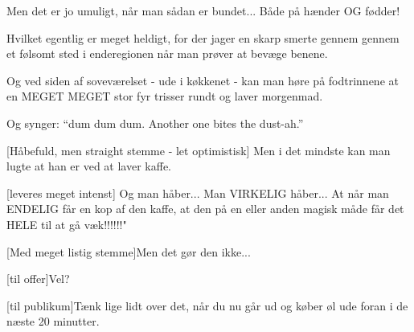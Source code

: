 \documentclass[a4paper,11pt]{article}
\begin{document}
\begin{sketch}

Men det er jo umuligt, når man sådan er bundet... Både på hænder OG
fødder!


Hvilket egentlig er meget heldigt, for der jager en skarp smerte
gennem gennem et følsomt sted i enderegionen når man prøver at bevæge
benene.


Og ved siden af soveværelset - ude i køkkenet - kan man høre på
fodtrinnene at en MEGET MEGET stor fyr trisser rundt og laver
morgenmad.


 Og synger:  ``dum dum dum. Another one bites the dust-ah.''


[Håbefuld, men straight stemme - let optimistisk] Men i det mindste kan
man lugte at han er ved at laver kaffe.


[leveres meget intenst] Og man håber... Man VIRKELIG håber... At når man
ENDELIG får en kop af den kaffe, at den på en eller anden magisk måde får det
HELE til at gå væk!!!!!!"


[Med meget listig stemme]Men det gør den ikke...


[til offer]Vel?

[til publikum]Tænk lige lidt over det, når du nu går ud og køber øl ude
foran i de næste 20 minutter.

\end{sketch}
\end{document}
